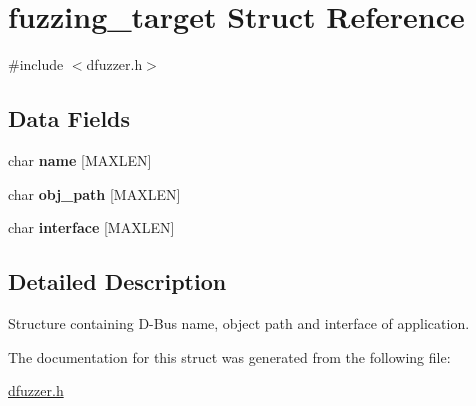 \hypertarget{structfuzzing__target}{\section{fuzzing\-\_\-target Struct Reference}
\label{structfuzzing__target}
}


{\ttfamily \#include $<$dfuzzer.\-h$>$}

\subsection*{Data Fields}
\begin{DoxyCompactItemize}
\item 
\hypertarget{structfuzzing__target_ad0c3ebbff859e5c33f2e7351c67d8cd0}{char {\bfseries name} \mbox{[}M\-A\-X\-L\-E\-N\mbox{]}}\label{structfuzzing__target_ad0c3ebbff859e5c33f2e7351c67d8cd0}

\item 
\hypertarget{structfuzzing__target_af0502404d7d369f7bd550f3af547a8ac}{char {\bfseries obj\-\_\-path} \mbox{[}M\-A\-X\-L\-E\-N\mbox{]}}\label{structfuzzing__target_af0502404d7d369f7bd550f3af547a8ac}

\item 
\hypertarget{structfuzzing__target_af7ba48a50d5556196b9684b53f9e552e}{char {\bfseries interface} \mbox{[}M\-A\-X\-L\-E\-N\mbox{]}}\label{structfuzzing__target_af7ba48a50d5556196b9684b53f9e552e}

\end{DoxyCompactItemize}


\subsection{Detailed Description}
Structure containing D-\/\-Bus name, object path and interface of application. 

The documentation for this struct was generated from the following file\-:\begin{DoxyCompactItemize}
\item 
\hyperlink{dfuzzer_8h}{dfuzzer.\-h}\end{DoxyCompactItemize}
